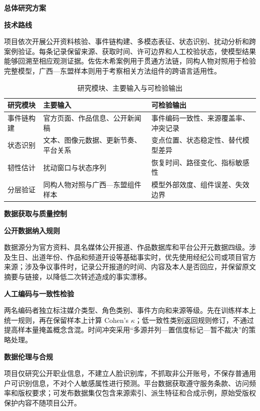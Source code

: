 \GXNSFBodyText

\noindent\textbf{总体研究方案}\par

\noindent\textbf{技术路线}\par
项目依次开展公开资料核验、事件链构建、多模态表征、状态识别、扰动分析和跨案例验证。每条记录保留来源、获取时间、许可边界和人工校验状态，使模型结果能够回溯至相应观测证据。佐佐木希案例用于贯通方法链，同构人物对照用于检验完整模型，广西—东盟样本则用于考察相关方法组件的跨语言适用性。

\begin{table}[htbp]
  \centering
  \fontsize{10}{14}\selectfont
  \caption{研究模块、主要输入与可检验输出}
  \begin{tabularx}{\textwidth}{p{}X X}
    \toprule
    研究模块 & 主要输入 & 可检验输出 \\
    \midrule
    事件链构建 & 官方页面、作品信息、公开新闻稿 & 事件编码一致性、来源覆盖率、冲突记录 \\
    状态识别 & 文本、图像元数据、更新节奏、平台关系 & 变点位置、状态稳定性、替代模型差异 \\
    韧性估计 & 扰动窗口与状态序列 & 恢复时间、路径变化、指标敏感性 \\
    分层验证 & 同构人物对照与广西—东盟组件样本 & 模型外部效度、组件误差、失效边界 \\
    \bottomrule
  \end{tabularx}
  \label{tab:gx-modules}
\end{table}

\noindent\textbf{数据获取与质量控制}\par

\noindent\textbf{公开数据纳入规则}\par
数据源分为官方资料、具名媒体公开报道、作品数据库和平台公开元数据四级。涉及生日、出道年份、作品和频道开设等基础事实时，优先使用经纪公司或项目官方来源；涉及争议事件时，记录公开报道的时间、内容及本人是否回应，并保留原文摘要与链接，以降低二次转述造成的事实漂移。

\noindent\textbf{人工编码与一致性检验}\par
两名编码者独立标注媒介类型、角色类别、事件方向和来源等级。先在训练样本上统一规则，再在保留样本上计算 Cohen's $\kappa$；低一致性类别返回规则修订，不通过提高样本量掩盖概念含混。时间冲突采用“多源并列—置信度标记—暂不裁决”的策略处理。

\noindent\textbf{数据伦理与合规}\par
项目仅研究公开职业信息，不建立人脸识别库，不抓取非公开账号，不保存普通用户可识别信息，不对个人敏感属性进行预测。平台数据获取遵守服务条款、访问频率和版权要求；可发布数据集仅包含来源索引、派生特征和合成示例，原始受版权保护内容不随项目公开。

